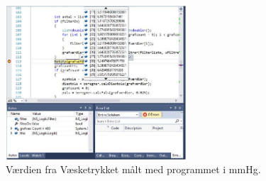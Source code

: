 \begin{figure}[H]
	\centering
	\includegraphics[width=0.6\textwidth]{Figurer/Test/mmHg}
	\caption{Værdien fra Væsketrykket målt med programmet i mmHg.}
	\label{fig:mmHgtryk}
\end{figure}